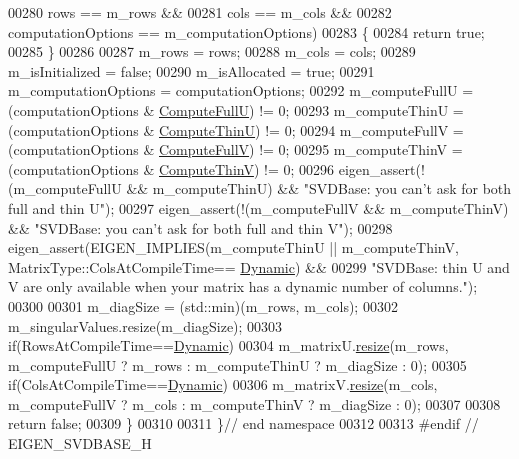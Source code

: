 \begin{DoxyCode}
00280       rows == m\_rows &&
00281       cols == m\_cols &&
00282       computationOptions == m\_computationOptions)
00283   \{
00284     \textcolor{keywordflow}{return} \textcolor{keyword}{true};
00285   \}
00286 
00287   m\_rows = rows;
00288   m\_cols = cols;
00289   m\_isInitialized = \textcolor{keyword}{false};
00290   m\_isAllocated = \textcolor{keyword}{true};
00291   m\_computationOptions = computationOptions;
00292   m\_computeFullU = (computationOptions & \hyperlink{group__enums_ggae3e239fb70022eb8747994cf5d68b4a9a2b4f91ca5859a4159dbfe8090043817f}{ComputeFullU}) != 0;
00293   m\_computeThinU = (computationOptions & \hyperlink{group__enums_ggae3e239fb70022eb8747994cf5d68b4a9af8c742a1aa87773e165eae406c9ccaf8}{ComputeThinU}) != 0;
00294   m\_computeFullV = (computationOptions & \hyperlink{group__enums_ggae3e239fb70022eb8747994cf5d68b4a9a52c6f7e80bbf9a42297c88f700245b51}{ComputeFullV}) != 0;
00295   m\_computeThinV = (computationOptions & \hyperlink{group__enums_ggae3e239fb70022eb8747994cf5d68b4a9a1055e53fa95c8ae04a07ebb72cfafd95}{ComputeThinV}) != 0;
00296   eigen\_assert(!(m\_computeFullU && m\_computeThinU) && \textcolor{stringliteral}{"SVDBase: you can't ask for both full and thin U"});
00297   eigen\_assert(!(m\_computeFullV && m\_computeThinV) && \textcolor{stringliteral}{"SVDBase: you can't ask for both full and thin V"});
00298   eigen\_assert(EIGEN\_IMPLIES(m\_computeThinU || m\_computeThinV, MatrixType::ColsAtCompileTime==
      \hyperlink{namespace_eigen_ad81fa7195215a0ce30017dfac309f0b2}{Dynamic}) &&
00299            \textcolor{stringliteral}{"SVDBase: thin U and V are only available when your matrix has a dynamic number of columns."});
00300 
00301   m\_diagSize = (std::min)(m\_rows, m\_cols);
00302   m\_singularValues.resize(m\_diagSize);
00303   \textcolor{keywordflow}{if}(RowsAtCompileTime==\hyperlink{namespace_eigen_ad81fa7195215a0ce30017dfac309f0b2}{Dynamic})
00304     m\_matrixU.\hyperlink{class_eigen_1_1_plain_object_base_a99d9054ee2d5a40c6e00ded0265e9cea}{resize}(m\_rows, m\_computeFullU ? m\_rows : m\_computeThinU ? m\_diagSize : 0);
00305   \textcolor{keywordflow}{if}(ColsAtCompileTime==\hyperlink{namespace_eigen_ad81fa7195215a0ce30017dfac309f0b2}{Dynamic})
00306     m\_matrixV.\hyperlink{class_eigen_1_1_plain_object_base_a99d9054ee2d5a40c6e00ded0265e9cea}{resize}(m\_cols, m\_computeFullV ? m\_cols : m\_computeThinV ? m\_diagSize : 0);
00307 
00308   \textcolor{keywordflow}{return} \textcolor{keyword}{false};
00309 \}
00310 
00311 \}\textcolor{comment}{// end namespace}
00312 
00313 \textcolor{preprocessor}{#endif // EIGEN\_SVDBASE\_H}
\end{DoxyCode}
